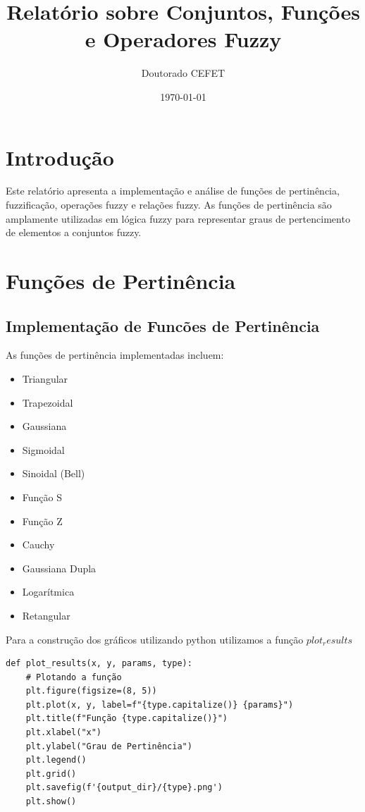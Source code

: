 \documentclass[a4paper,12pt]{article}
\title{Relatório sobre Conjuntos, Funções e Operadores Fuzzy}
\author{Doutorado CEFET}
\date{\today}
\begin{document}
\maketitle

\section{Introdução}
Este relatório apresenta a implementação e análise de funções de pertinência, fuzzificação, operações fuzzy e relações fuzzy. As funções de pertinência são amplamente utilizadas em lógica fuzzy para representar graus de pertencimento de elementos a conjuntos fuzzy.

\section{Funções de Pertinência}
\subsection{Implementação de Funcões de Pertinência}

As funções de pertinência implementadas incluem:


\begin{itemize}
    \item Triangular
    \item Trapezoidal
    \item Gaussiana
    \item Sigmoidal
    \item Sinoidal (Bell)
    \item Função S
    \item Função Z
    \item Cauchy
    \item Gaussiana Dupla
    \item Logarítmica
    \item Retangular
\end{itemize}

Para a construção dos gráficos utilizando python utilizamos a função $plot_results$

\begin{verbatim}
def plot_results(x, y, params, type):
    # Plotando a função
    plt.figure(figsize=(8, 5))
    plt.plot(x, y, label=f"{type.capitalize()} {params}")
    plt.title(f"Função {type.capitalize()}")
    plt.xlabel("x")
    plt.ylabel("Grau de Pertinência")
    plt.legend()
    plt.grid()
    plt.savefig(f'{output_dir}/{type}.png')
    plt.show()
\end{verbatim}
    
\end{document}
